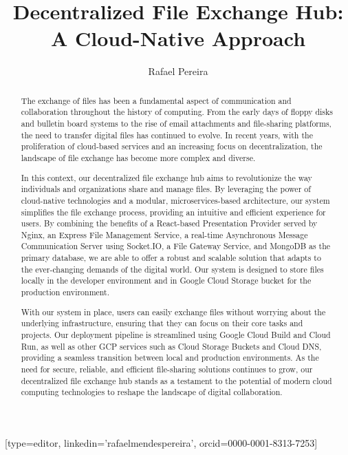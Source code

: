 \documentclass[a4paper,fleqn]{cas-dc}
\begin{document}
\let\WriteBookmarks\relax
\def\floatpagepagefraction{1}
\def\textpagefraction{.001}


\title [mode = title]{Decentralized File Exchange Hub: A Cloud-Native Approach}                     


\author[1]{Rafael Pereira}[type=editor,
                        linkedin='rafaelmendespereira',
                        orcid=0000-0001-8313-7253]
   
\address[1]{Computer Science and Communications Research Centre, School of Technology and Management, Polytechnic of Leiria, 2411-901 Leiria, Portugal}

\begin{abstract}

The exchange of files has been a fundamental aspect of communication and collaboration throughout the history of computing. From the early days of floppy disks and bulletin board systems to the rise of email attachments and file-sharing platforms, the need to transfer digital files has continued to evolve. In recent years, with the proliferation of cloud-based services and an increasing focus on decentralization, the landscape of file exchange has become more complex and diverse.

In this context, our decentralized file exchange hub aims to revolutionize the way individuals and organizations share and manage files. By leveraging the power of cloud-native technologies and a modular, microservices-based architecture, our system simplifies the file exchange process, providing an intuitive and efficient experience for users. By combining the benefits of a React-based Presentation Provider served by Nginx, an Express File Management Service, a real-time Asynchronous Message Communication Server using Socket.IO, a File Gateway Service, and MongoDB as the primary database, we are able to offer a robust and scalable solution that adapts to the ever-changing demands of the digital world. Our system is designed to store files locally in the developer environment and in Google Cloud Storage bucket for the production environment.

With our system in place, users can easily exchange files without worrying about the underlying infrastructure, ensuring that they can focus on their core tasks and projects. Our deployment pipeline is streamlined using Google Cloud Build and Cloud Run, as well as other GCP services such as Cloud Storage Buckets and Cloud DNS, providing a seamless transition between local and production environments. As the need for secure, reliable, and efficient file-sharing solutions continues to grow, our decentralized file exchange hub stands as a testament to the potential of modern cloud computing technologies to reshape the landscape of digital collaboration.

\end{abstract}
\end{document}

